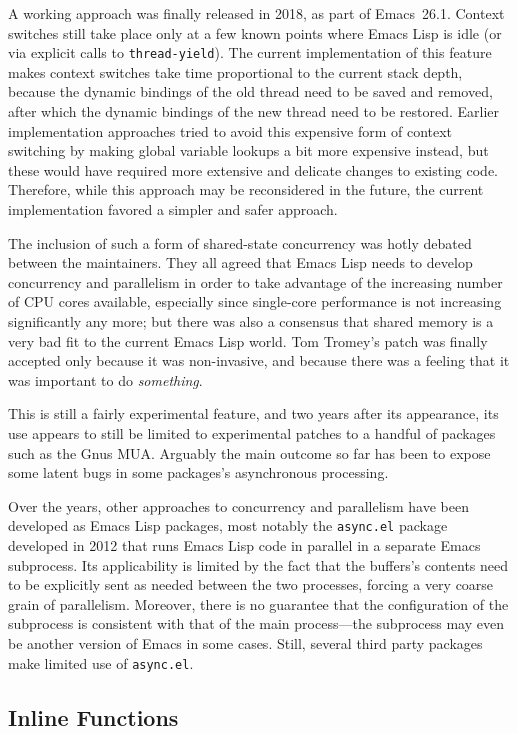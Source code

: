 \documentclass[format=acmsmall,screen]{acmart}
\newcommand \Elisp {Emacs Lisp}
\begin{document}
A working approach was finally released in 2018, as part of Emacs~26.1.
Context switches still take place only at a few known points where \Elisp{}
is idle (or via explicit calls to \texttt{thread-yield}).  The current
implementation of this feature makes context switches take time proportional
to the current stack depth, because the dynamic bindings of the old thread
need to be saved and removed, after which the dynamic bindings of the new
thread need to be restored.  Earlier implementation approaches tried to
avoid this expensive form of context switching by making global variable
lookups a bit more expensive instead, but these would have required more extensive
and delicate changes to existing code.  Therefore, while this approach
may be reconsidered in the future, the current implementation favored a simpler and
safer approach.

The inclusion of such a form of shared-state concurrency was hotly debated
between the maintainers.  They all agreed that \Elisp{} needs to develop
concurrency and parallelism in order to take advantage of the increasing
number of CPU cores available, especially since single-core performance is
not increasing significantly any more; but there was also a consensus that
shared memory is a very bad fit to the current \Elisp{} world.  Tom Tromey's
patch was finally accepted only because it was non-invasive,
and because there was a feeling that it was important to do
\emph{something}.

This is still a fairly experimental feature, and two years after its
appearance, its use appears to still be limited to experimental patches to
a handful of packages such as the Gnus MUA.  Arguably the main outcome so
far has been to expose some latent bugs in some packages's
asynchronous processing.

Over the years, other approaches to concurrency and parallelism have been
developed as \Elisp{} packages, most notably the \texttt{async.el}
package~\cite{WiegleyAsync2019} developed in 2012 that runs \Elisp{} code
in parallel in a separate Emacs subprocess.  Its applicability is limited by the fact that the buffers's contents
need to be explicitly sent as needed between the two processes, forcing
a very coarse grain of parallelism.
Moreover, there is no
guarantee that the configuration of the subprocess is consistent with that
of the main process---the subprocess may even be another version of Emacs in
some cases.  Still, several third party packages make limited use of
\texttt{async.el}.

\subsection{Inline Functions}
\label{sec:inline-functions}
\end{document}

